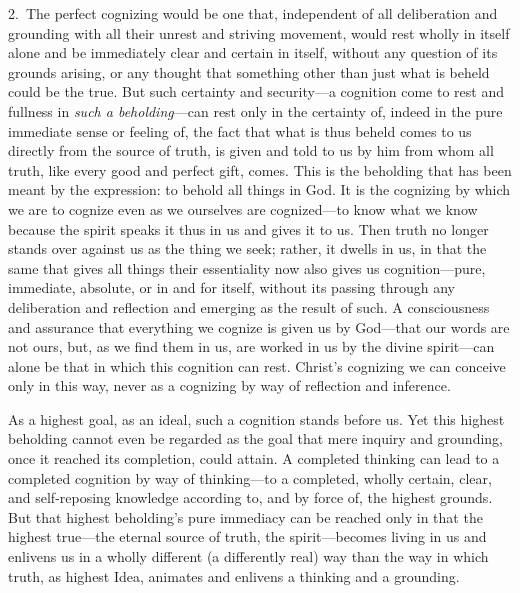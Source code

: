\documentclass[12pt,a4paper]{book}
\begin{document}
2.~The perfect cognizing would be one that, independent of all deliberation and
grounding with all their unrest and striving movement, would rest wholly in
itself alone and be immediately clear and certain in itself, without any question
of its grounds arising, or any thought that something other than just what is
beheld could be the true. But such certainty and security---a cognition come to
rest and fullness in \emph{such a beholding}---can rest only in the certainty of, indeed
in the pure immediate sense or feeling of, the fact that what is thus beheld
comes to us directly from the source of truth, is given and told to us by him
from whom all truth, like every good and perfect gift, comes. This is the
beholding that has been meant by the expression: to behold all things in God. It
is the cognizing by which we are to cognize even as we ourselves are
cognized---to know what we know because the spirit speaks it thus in us and gives
it to us. Then truth no longer stands over against us as the thing we seek;
rather, it dwells in us, in that the same that gives all things their
essentiality now also gives us cognition---pure, immediate, absolute, or in and
for itself, without its passing through any deliberation and reflection and
emerging as the result of such. A consciousness and assurance that everything we
cognize is given us by God---that our words are not ours, but, as we find them in
us, are worked in us by the divine spirit---can alone be that in which this
cognition can rest. Christ's cognizing we can conceive only in this way, never as
a cognizing by way of reflection and inference.

As a highest goal, as an ideal, such a cognition stands before us. Yet this
highest beholding cannot even be regarded as the goal that mere inquiry and
grounding, once it reached its completion, could attain. A completed thinking can
lead to a completed cognition by way of thinking---to a completed, wholly
certain, clear, and self-reposing knowledge according to, and by force of, the
highest grounds. But that highest beholding's pure immediacy can be reached only
in that the highest true---the eternal source of truth, the spirit---becomes
living in us and enlivens us in a wholly different (a differently real) way than
the way in which truth, as highest Idea, animates and enlivens a thinking and a
grounding.
\end{document}
